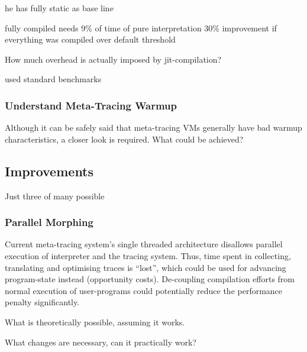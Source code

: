 he has fully static as base line

fully compiled needs 9\% of time of pure interpretation
30\% improvement if everything was compiled over default threshold



How much overhead is actually imposed by jit-compilation?

used standard benchmarks


\subsubsection{Understand Meta-Tracing Warmup}

Although it can be safely said that meta-tracing VMs generally have bad warmup
characteristics, a closer look is required. What could be achieved?



\subsection{Improvements}

Just three of many possible

\subsubsection{Parallel Morphing} Current meta-tracing system's single threaded
architecture disallows parallel execution of interpreter and the tracing system.
Thus, time spent in collecting, translating and optimising traces is ``lost'',
which could be used for advancing program-state instead (opportunity costs).
De-coupling compilation efforts from normal execution of user-programs could
potentially reduce the performance penalty significantly.



What is theoretically possible, assuming it works.

What changes are necessary, can it practically work?

